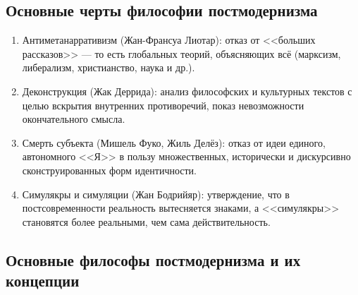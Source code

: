 \documentclass[12pt,a4paper]{article}
\begin{document}
	\subsection{Основные черты философии постмодернизма}
	\begin{enumerate}
		\item Антиметанарративизм (Жан-Франсуа Лиотар): отказ от <<больших рассказов>> — то есть глобальных теорий, объясняющих всё (марксизм, либерализм, христианство, наука и др.).
		\item Деконструкция (Жак Деррида): анализ философских и культурных текстов с целью вскрытия внутренних противоречий, показ невозможности окончательного смысла.
		\item Смерть субъекта (Мишель Фуко, Жиль Делёз): отказ от идеи единого, автономного <<Я>> в пользу множественных, исторически и дискурсивно сконструированных форм идентичности.
		\item Симулякры и симуляции (Жан Бодрийяр): утверждение, что в постсовременности реальность вытесняется знаками, а <<симулякры>> становятся более реальными, чем сама действительность.
	\end{enumerate}
	
	\subsection{Основные философы постмодернизма и их концепции}
	
\end{document}

